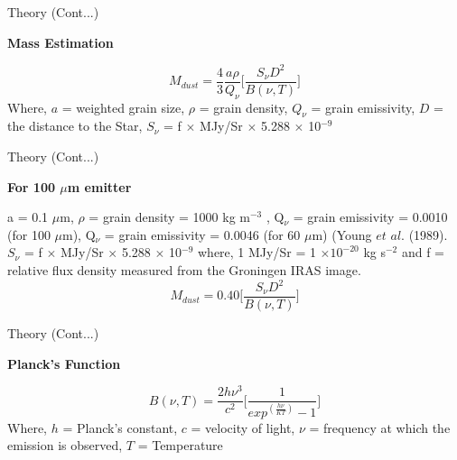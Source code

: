 \documentclass[12pt,a4paper]{beamer}
\begin{document}
\begin{frame}{Theory (Cont...)}
\begin{block}{\centering\textbf{Mass Estimation \vspace*{.05cm}}}
\begin{itemize}
\begin{equation}
 M_{dust} = \frac{4}{{3}}\frac{a\rho}{{Q_{\nu}}}\bigg[\frac{S_{\nu}D^{2}}{{B(\nu, T)}}\bigg]
\end{equation}
Where,
$a$ = weighted grain size,
$\rho$ = grain density,
$ Q_{\nu}$ = grain emissivity,
$D$ = the distance to the Star,
$ S_{\nu}$ = f $\times$ MJy/Sr $\times$ 5.288 $\times$ 10$^{-9}$
\cite{40}\end{itemize}
\end{block}



\begin{frame}{Theory (Cont...)}
\begin{block}{\centering\textbf{For 100 $\mu$m emitter \vspace*{.05cm}}}
\begin{itemize}
a = 0.1 $\mu$m, $\rho$ = grain density =
1000 kg m$^{−3}$ , Q$_{\nu}$ = grain emissivity = 0.0010 (for 100 $\mu$m), Q$_{\nu}$ =
grain emissivity = 0.0046 (for 60 $\mu$m) (Young $et$ $al.$
(1989)\cite{39}. $ S_{\nu}$ = f $\times$ MJy/Sr $\times$ 5.288 $\times$ 10$^{-9}$
where, 1 MJy/Sr = 1 $\times 10^{-20}$ kg s$^{-2}$ and f = relative
flux density measured from the Groningen IRAS image.\cite{40, 41}
\begin{equation}\label{9}
    M_{dust} = 0.40\bigg[\frac{S_{\nu}D^{2}}{{B(\nu, T)}}\bigg]
\end{equation}
\end{itemize}
\end{block}
\end{frame}

\begin{frame}{Theory (Cont...)}
\begin{block}{\centering\textbf{Planck's Function \vspace*{.05cm}}}
\begin{itemize}
\begin{equation}\label{10}
    B(\nu, T) = \frac{2h\nu^{3}}{{c^{2}}}\bigg[\frac{1}{exp^(\frac{h\nu}{KT})-1}\bigg]
\end{equation}
Where,
$h$ = Planck's constant,
$c$ = velocity of light,
${\nu}$ = frequency at which the emission is observed,
$T$ = Temperature
\end{itemize}
\end{block}
\end{frame}


\end{frame}
\end{document}
